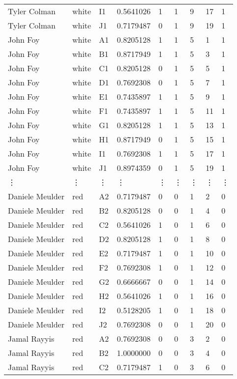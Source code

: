 \documentclass[11pt]{article}
\begin{document}
\begin{tabular}{lllllllll}
	 Tyler Colman    & white & I1 & 0.5641026 & 1 & 1 & 9 & 17 & 1\\
	 Tyler Colman    & white & J1 & 0.7179487 & 0 & 1 & 9 & 19 & 1\\
	 John Foy        & white & A1 & 0.8205128 & 1 & 1 & 5 &  1 & 1\\
	 John Foy        & white & B1 & 0.8717949 & 1 & 1 & 5 &  3 & 1\\
	 John Foy        & white & C1 & 0.8205128 & 0 & 1 & 5 &  5 & 1\\
	 John Foy        & white & D1 & 0.7692308 & 0 & 1 & 5 &  7 & 1\\
	 John Foy        & white & E1 & 0.7435897 & 1 & 1 & 5 &  9 & 1\\
	 John Foy        & white & F1 & 0.7435897 & 1 & 1 & 5 & 11 & 1\\
	 John Foy        & white & G1 & 0.8205128 & 1 & 1 & 5 & 13 & 1\\
	 John Foy        & white & H1 & 0.8717949 & 0 & 1 & 5 & 15 & 1\\
	 John Foy        & white & I1 & 0.7692308 & 1 & 1 & 5 & 17 & 1\\
	 John Foy        & white & J1 & 0.8974359 & 0 & 1 & 5 & 19 & 1\\
	 ⋮ & ⋮ & ⋮ & ⋮ & ⋮ & ⋮ & ⋮ & ⋮ & ⋮\\
	 Daniele Meulder & red & A2 & 0.7179487 & 0 & 0 & 1 &  2 & 0\\
	 Daniele Meulder & red & B2 & 0.8205128 & 0 & 0 & 1 &  4 & 0\\
	 Daniele Meulder & red & C2 & 0.5641026 & 1 & 0 & 1 &  6 & 0\\
	 Daniele Meulder & red & D2 & 0.8205128 & 1 & 0 & 1 &  8 & 0\\
	 Daniele Meulder & red & E2 & 0.7179487 & 1 & 0 & 1 & 10 & 0\\
	 Daniele Meulder & red & F2 & 0.7692308 & 1 & 0 & 1 & 12 & 0\\
	 Daniele Meulder & red & G2 & 0.6666667 & 0 & 0 & 1 & 14 & 0\\
	 Daniele Meulder & red & H2 & 0.5641026 & 1 & 0 & 1 & 16 & 0\\
	 Daniele Meulder & red & I2 & 0.5128205 & 1 & 0 & 1 & 18 & 0\\
	 Daniele Meulder & red & J2 & 0.7692308 & 0 & 0 & 1 & 20 & 0\\
	 Jamal Rayyis    & red & A2 & 0.7692308 & 0 & 0 & 3 &  2 & 0\\
	 Jamal Rayyis    & red & B2 & 1.0000000 & 0 & 0 & 3 &  4 & 0\\
	 Jamal Rayyis    & red & C2 & 0.7179487 & 1 & 0 & 3 &  6 & 0\\

\end{tabular}
\end{document}
